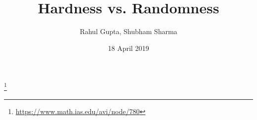 \documentclass[xcolor={table,dvipsnames,usenames}]{beamer}
\title{Hardness vs. Randomness}
\author{Rahul Gupta\inst{1}, 
	Shubham Sharma\inst{1}}
\institute[Universities of Somewhere and Elsewhere] %
{
  \inst{1}%
  Indian Institute of Technology Kanpur, India}
\date{18 April 2019}
\begin{document}
\newcommand{\ddnnf}{\ensuremath{\mathsf{dag}}}
\newcommand{\WAPS}{\ensuremath{\mathsf{WAPS}}}
\newcommand{\KUS}{\ensuremath{\mathsf{KUS}}}
\newcommand{\DSPACE}{\ensuremath{\mathsf{DSPACE}}}
\newcommand{\RNC}{\ensuremath{\mathsf{RNC}}}
\newcommand{\BPP}{\ensuremath{\mathsf{BPP}}}
\newcommand{\DTIME}{\ensuremath{\mathsf{DTIME}}}
\newcommand{\RTIME}{\ensuremath{\mathsf{RTIME}}}
\newcommand{\WeightGen}{\ensuremath{\mathsf{WeightGen}}}
\newcommand{\prob}{\ensuremath{\mathsf{Pr}}}
\newcommand{\UniGen}{\ensuremath{\mathsf{UniGen2}}}
\newcommand{\satisfying}[1]{\ensuremath{R_{#1}}} %
\newcommand{\satisfyingv}[2]{\ensuremath{R_{#1\downarrow #2}}}
\newcommand{\Sampler}{\ensuremath{\mathsf{Sampler}}}
\newcommand{\sampleList}{\ensuremath{\mathsf{SampleList}}}
\newcommand{\Shuffle}{\ensuremath{\mathsf{Shuffle}}}
\newcommand{\Append}{\ensuremath{\mathsf{Append}}}
\newcommand{\Stitch}{\ensuremath{\mathsf{Stitch}}}
\newcommand{\IS}{\ensuremath{\mathsf{IS}}}
\newcommand{\normalize}{\ensuremath{\mathsf{Normalize}}}
\newcommand{\WCounter}{\ensuremath{\mathsf{WAnnotate}}}
\newcommand{\PCompile}{\ensuremath{\mathsf{PCompile}}}


\begin{frame}
  \titlepage
  \begin{center}
  	\footnote{\href{https://www.math.ias.edu/avi/node/780}{https://www.math.ias.edu/avi/node/780}}
  \end{center}
  
\end{frame}
\end{document}
